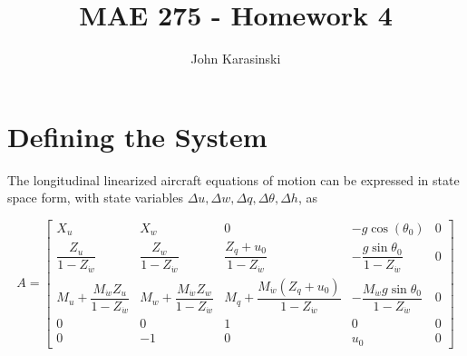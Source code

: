 \documentclass[12pt]{article}
\title{MAE 275 - Homework 4}
\author{John Karasinski}
\begin{document}
\maketitle

\section{Defining the System}
The longitudinal linearized aircraft equations of motion can be expressed in state space form, with state variables $\Delta u, \Delta w, \Delta q, \Delta \theta, \Delta h$, as

\begin{equation*}
A =
\begin{bmatrix}
    X_u & X_w & 0 & -g \cos(\theta_0) & 0 \\
    \dfrac{Z_u}{1-Z_{\dot{w}}} & \dfrac{Z_w}{1-Z_{\dot{w}}} & \dfrac{Z_q + u_0}{1-Z_{\dot{w}}} & -\dfrac{g\sin \theta_0}{1-Z_{\dot{w}}} & 0 \\
    M_u + \dfrac{M_{\dot{w}} Z_u}{1-Z_{\dot{w}}} & M_w + \dfrac{M_{\dot{w}} Z_w}{1-Z_{\dot{w}}} & M_q + \dfrac{M_{\dot{w}} (Z_q + u_0)}{1-Z_{\dot{w}}} & -\dfrac{M_{\dot{w}} g\sin \theta_0}{1-Z_{\dot{w}}} & 0 \\
    0 & 0 & 1 & 0 & 0 \\
    0 & -1 & 0 & u_0 & 0
\end{bmatrix}
\end{equation*}
\end{document}
